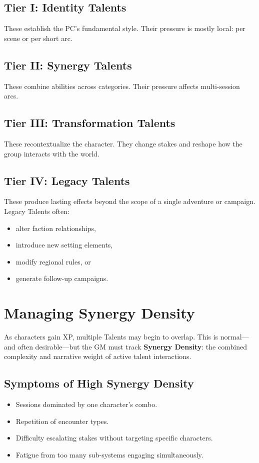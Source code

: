 \documentclass[11pt]{book}
\begin{document}
\subsection{Tier I: Identity Talents}
These establish the PC's fundamental style.
Their pressure is mostly local: per scene or per short arc.

\subsection{Tier II: Synergy Talents}
These combine abilities across categories.
Their pressure affects multi-session arcs.

\subsection{Tier III: Transformation Talents}
These recontextualize the character.
They change stakes and reshape how the group interacts with the world.

\subsection{Tier IV: Legacy Talents}
These produce lasting effects beyond the scope of a single adventure or campaign.
Legacy Talents often:
\begin{itemize}
    \item alter faction relationships,  
    \item introduce new setting elements,  
    \item modify regional rules, or  
    \item generate follow-up campaigns.
\end{itemize}

\section{Managing Synergy Density}

As characters gain XP, multiple Talents may begin to overlap.
This is normal---and often desirable---but the GM must track
\textbf{Synergy Density}: the combined complexity and narrative weight
of active talent interactions.

\subsection{Symptoms of High Synergy Density}

\begin{itemize}
    \item Sessions dominated by one character's combo.
    \item Repetition of encounter types.
    \item Difficulty escalating stakes without targeting specific characters.
    \item Fatigue from too many sub-systems engaging simultaneously.
\end{itemize}
\end{document}
